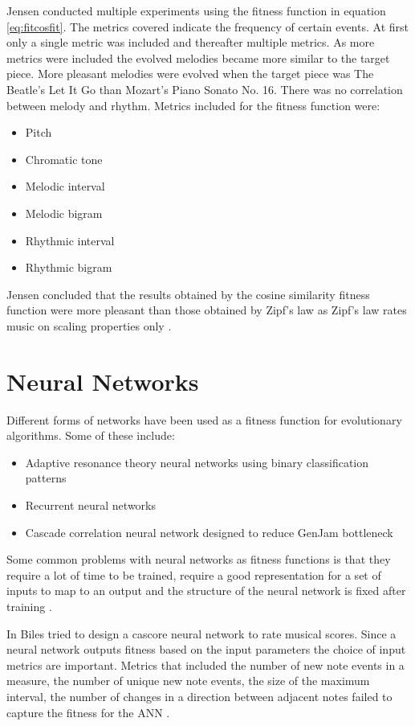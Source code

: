 Jensen conducted multiple experiments using the fitness function in equation \ref{eq:fitcosfit}. The metrics covered indicate the frequency of certain events. At first only a single metric was included and thereafter multiple metrics. As more metrics were included the evolved melodies became more similar to the target piece. More pleasant melodies were evolved when the target piece was The Beatle's Let It Go than Mozart's Piano Sonato No. 16. There was no correlation between melody and rhythm.
Metrics included for the fitness function were:
\begin{itemize}
\item Pitch
\item Chromatic tone
\item Melodic interval
\item Melodic bigram
\item Rhythmic interval
\item Rhythmic bigram
\end{itemize}
Jensen concluded that the results obtained by the cosine similarity fitness function were more pleasant than those obtained by Zipf's law as Zipf's law rates music on scaling properties only \cite{Dostal2013}.



\section{Neural Networks} \label{sec:ANN_fitness}
Different forms of networks have been used as a fitness function for evolutionary algorithms.
Some of these include:
\begin{itemize}
\item Adaptive resonance theory neural networks using binary classification patterns \cite{Burton97geneticalgorithm}
\item Recurrent neural networks
\item Cascade correlation neural network designed to reduce GenJam bottleneck \cite{Biles1996}
\end{itemize}

Some common problems with neural networks as fitness functions is that they require a lot of time to be trained, require a good representation for a set of inputs to map to an output and the structure of the neural network is fixed after training \cite{Burton97geneticalgorithm}. 

In \cite{Biles1996} Biles tried to design a cascore neural network to rate musical scores. Since a neural network outputs fitness based on the input parameters the choice of input metrics are important.
Metrics that included the number of new note events in a measure, the number of unique new note events, the size of the maximum interval, the number of changes in a direction between adjacent notes failed to capture the fitness for the \ac{ANN} \cite{Biles1996}.

